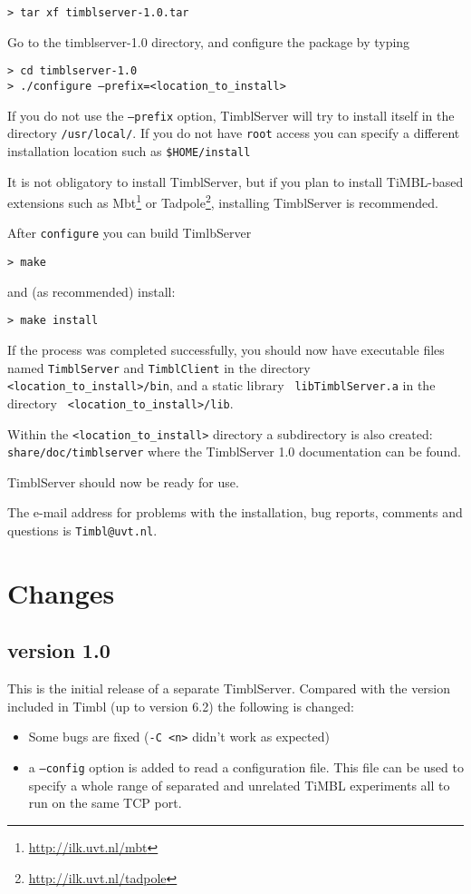\documentclass{report}
\begin{document}
{\tt > tar xf timblserver-1.0.tar}

Go to the timblserver-1.0 directory, and configure the package by typing

{\tt > cd timblserver-1.0} \\
{\tt > ./configure --prefix=<location\_to\_install>}

If you do not use the {\tt --prefix} option, TimblServer will try to
install itself in the directory {\tt /usr/local/}.  If you do not have
{\tt root} access you can specify a different installation location
such as {\tt \$HOME/install}

It is not obligatory to install TimblServer, but if you plan to
install TiMBL-based extensions such as
Mbt\footnote{\url{http://ilk.uvt.nl/mbt}} or
Tadpole\footnote{\url{http://ilk.uvt.nl/tadpole}}, installing
TimblServer is recommended.

After {\tt configure} you can build TimlbServer

{\tt > make}

and (as recommended) install:

{\tt > make install }

If the process was completed successfully, you should now have
executable files named {\tt TimblServer} and {\tt TimblClient} in the
directory {\tt <location\_to\_install>/bin}, and a static library {\tt
  libTimblServer.a} in the directory {\tt
  <location\_to\_install>/lib}.

Within the {\tt <location\_to\_install>} directory a subdirectory is
also created: {\tt share/doc/timblserver} where the TimblServer 1.0
documentation can be found.

TimblServer should now be ready for use. 

The e-mail address for problems with the installation, bug reports, comments and questions is {\tt Timbl@uvt.nl}.

\chapter{Changes}
\label{changes}

\section{version 1.0}

This is the initial release of a separate TimblServer.
Compared with the version included in Timbl (up to version 6.2) the following is changed:

\begin{itemize}

\item Some bugs are fixed ({\tt -C <n>} didn't work as expected)
\item a {\tt --config} option is added to read a configuration file. This
  file can be used to specify a whole range of separated and unrelated
  TiMBL experiments all to run on the same TCP port.

\end{itemize}
\end{document}

